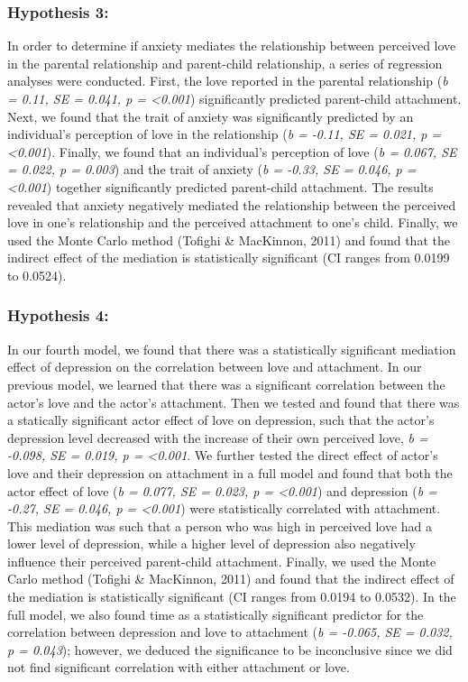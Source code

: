 \documentclass[man]{apa6}
\begin{document}
\hypertarget{hypothesis-3}{%
\subsubsection{Hypothesis 3:}\label{hypothesis-3}}

In order to determine if anxiety mediates the relationship between perceived love in the parental relationship and parent-child relationship, a series of regression analyses were conducted. First, the love reported in the parental relationship (\emph{b = 0.11, SE = 0.041, p = \textless{}0.001}) significantly predicted parent-child attachment. Next, we found that the trait of anxiety was significantly predicted by an individual's perception of love in the relationship (\emph{b = -0.11, SE = 0.021, p = \textless{}0.001}). Finally, we found that an individual's perception of love (\emph{b = 0.067, SE = 0.022, p = 0.003}) and the trait of anxiety (\emph{b = -0.33, SE = 0.046, p = \textless{}0.001}) together significantly predicted parent-child attachment. The results revealed that anxiety negatively mediated the relationship between the perceived love in one's relationship and the perceived attachment to one's child. Finally, we used the Monte Carlo method (Tofighi \& MacKinnon, 2011) and found that the indirect effect of the mediation is statistically significant (CI ranges from 0.0199 to 0.0524).

\hypertarget{hypothesis-4}{%
\subsubsection{Hypothesis 4:}\label{hypothesis-4}}

In our fourth model, we found that there was a statistically significant mediation effect of depression on the correlation between love and attachment. In our previous model, we learned that there was a significant correlation between the actor's love and the actor's attachment. Then we tested and found that there was a statically significant actor effect of love on depression, such that the actor's depression level decreased with the increase of their own perceived love, \emph{b = -0.098, SE = 0.019, p = \textless{}0.001}. We further tested the direct effect of actor's love and their depression on attachment in a full model and found that both the actor effect of love (\emph{b = 0.077, SE = 0.023, p = \textless{}0.001}) and depression (\emph{b = -0.27, SE = 0.046, p = \textless{}0.001}) were statistically correlated with attachment. This mediation was such that a person who was high in perceived love had a lower level of depression, while a higher level of depression also negatively influence their perceived parent-child attachment. Finally, we used the Monte Carlo method (Tofighi \& MacKinnon, 2011) and found that the indirect effect of the mediation is statistically significant (CI ranges from 0.0194 to 0.0532).
In the full model, we also found time as a statistically significant predictor for the correlation between depression and love to attachment (\emph{b = -0.065, SE = 0.032, p = 0.043}); however, we deduced the significance to be inconclusive since we did not find significant correlation with either attachment or love.
\end{document}
